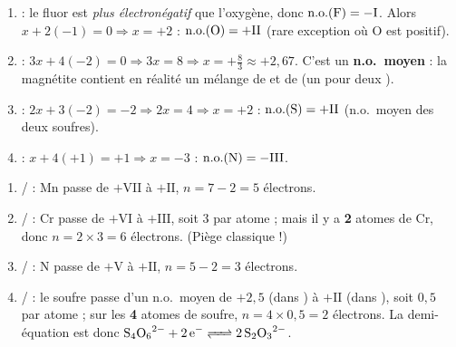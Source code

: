 \documentclass[11pt,a4paper]{article}
\begin{document}
\begin{corrige}
\begin{enumerate}[label=\alph*)]
  \item {} : le fluor est \emph{plus électronégatif} que l'oxygène, donc
        $\mathrm{n.o.}(\ce{F})=-\mathrm{I}$. Alors $x+2(-1)=0\Rightarrow x=+2$ :
        $\mathrm{n.o.}(\ce{O})=+\mathrm{II}$ (rare exception où O est positif).
  \item {} : $3x+4(-2)=0\Rightarrow 3x=8\Rightarrow x=+\tfrac{8}{3}\approx +2{,}67$. C'est un
        \textbf{n.o.\ moyen} : la magnétite contient en réalité un mélange de  et de
         (un  pour deux ).
  \item {} : $2x+3(-2)=-2\Rightarrow 2x=4\Rightarrow x=+2$ :
        $\mathrm{n.o.}(\ce{S})=+\mathrm{II}$ (n.o.\ moyen des deux soufres).
  \item {} : $x+4(+1)=+1\Rightarrow x=-3$ : $\mathrm{n.o.}(\ce{N})=-\mathrm{III}$.
\end{enumerate}
\end{corrige}

\begin{corrige}
\begin{enumerate}[label=\alph*)]
  \item {}/ : Mn passe de $+\mathrm{VII}$ à $+\mathrm{II}$, $n=7-2=5$ électrons.
  \item {}/ : Cr passe de $+\mathrm{VI}$ à $+\mathrm{III}$, soit $3$ par atome ;
        mais il y a \textbf{2} atomes de Cr, donc $n=2\times 3=6$ électrons. (Piège classique !)
  \item {}/ : N passe de $+\mathrm{V}$ à $+\mathrm{II}$, $n=5-2=3$ électrons.
  \item {}/ : le soufre passe d'un n.o.\ moyen de $+2{,}5$ (dans
        ) à $+\mathrm{II}$ (dans ), soit $0{,}5$ par atome ; sur les
        \textbf{4} atomes de soufre, $n=4\times 0{,}5=2$ électrons. La demi-équation est donc
        $\ce{S4O6^{2-} + 2 e^- <=> 2 S2O3^{2-}}$.
\end{enumerate}
\end{corrige}
\end{document}
